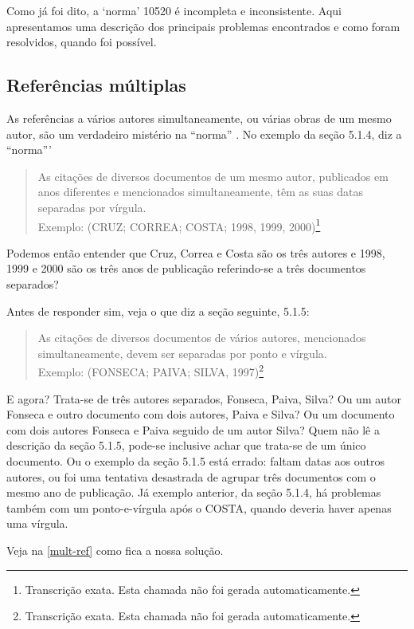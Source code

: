 \documentclass[a4paper]{ltxdoc}
\begin{document}
Como já foi dito, a `norma' 10520 \cite{NBR10520:2001} é incompleta e
inconsistente. Aqui apresentamos uma descrição dos principais problemas
encontrados e como foram resolvidos, quando foi possível.

\subsection{Referências múltiplas}

As referências a vários autores simultaneamente, ou várias obras de um mesmo
autor, são um verdadeiro mistério na ``norma'' \cite{NBR10520:2001}. No exemplo
da seção 5.1.4, diz a ``norma'''

\begin{quote}
As citações de diversos documentos de um mesmo autor, publicados em anos diferentes
e mencionados simultaneamente, têm as suas datas separadas por vírgula.\\
Exemplo: (CRUZ; CORREA; COSTA; 1998, 1999, 2000)\footnote{Transcrição exata. Esta
chamada não foi gerada automaticamente.}
\end{quote}

Podemos então entender que Cruz, Correa e Costa são os três autores e 1998, 1999
e 2000 são os três anos de publicação referindo-se a três documentos separados?

Antes de responder sim, veja o que diz a seção seguinte, 5.1.5:

\begin{quote}
As citações de diversos documentos de vários autores, mencionados simultaneamente,
devem ser separadas por ponto e vírgula.\\
Exemplo: (FONSECA; PAIVA; SILVA, 1997)\footnote{Transcrição exata. Esta
chamada não foi gerada automaticamente.}
\end{quote}

E agora? Trata-se de três autores separados, Fonseca, Paiva, Silva? Ou um
autor Fonseca e outro documento com dois autores, Paiva e Silva? Ou um
documento com dois autores Fonseca e Paiva seguido de um autor Silva?
Quem não lê a descrição da seção 5.1.5, pode-se inclusive achar que trata-se
de um único documento. Ou o exemplo da seção 5.1.5 está errado: faltam datas aos
outros autores, ou foi uma tentativa desastrada de agrupar três documentos com
o mesmo ano de publicação. Já exemplo anterior, da seção 5.1.4, há problemas
também com um ponto-e-vírgula após o COSTA, quando deveria haver apenas uma
vírgula.

Veja na \autoref{mult-ref} como fica a nossa solução.
\end{document}
